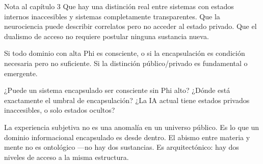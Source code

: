 \begin{notacap}{Nota al capítulo 3}
 Que hay una distinción real entre sistemas con estados internos inaccesibles y sistemas completamente transparentes. Que la neurociencia puede describir correlatos pero no acceder al estado privado. Que el dualismo de acceso no requiere postular ninguna sustancia nueva.

 Si todo dominio con alta Phi es consciente, o si la encapsulación es condición necesaria pero no suficiente. Si la distinción público/privado es fundamental o emergente.

 ¿Puede un sistema encapsulado ser consciente sin Phi alto? ¿Dónde está exactamente el umbral de encapsulación? ¿La IA actual tiene estados privados inaccesibles, o solo estados ocultos?

 La experiencia subjetiva no es una anomalía en un universo público. Es lo que un dominio informacional encapsulado es desde dentro. El abismo entre materia y mente no es ontológico —no hay dos sustancias. Es arquitectónico: hay dos niveles de acceso a la misma estructura.
\end{notacap}
